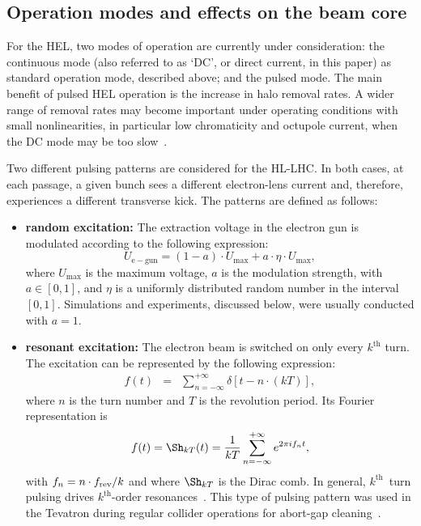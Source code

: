 \documentclass[%
 reprint,
 amsmath,amssymb,
 aps,
prstab,
longbibliography
]{revtex4-1}
\begin{document}
\subsection{Operation modes and effects on the beam core}
\label{sec:hel:core}

For the HEL, two modes of operation are currently under consideration:
the continuous mode (also referred to as `DC', or direct current, in
this paper) as standard operation mode, described above; and the
pulsed mode. The main benefit of pulsed HEL operation is the increase
in halo removal rates. A wider range of removal rates may become
important under operating conditions with small nonlinearities, in
particular low chromaticity and octupole current, when the DC mode may
be too slow~\cite{hel_halo_hllhc_fitterer, hl_halo_ipac2017}.

Two different pulsing patterns are considered for the HL-LHC. In both
cases, at each passage, a given bunch sees a different electron-lens
current and, therefore, experiences a different transverse kick. The
patterns are defined as follows:

\begin{itemize}

\item \textbf{random excitation:} The extraction voltage in the
  electron gun is modulated according to the
  following expression:
%
  \begin{equation}
    U_{\mathrm{e-gun}} = (1-a) \cdot U_{\mathrm{max}} +
    a \cdot \eta \cdot U_{\mathrm{max}},
  \end{equation}
%
  where $U_{\mathrm{max}}$ is the maximum voltage, $a$ is the
  modulation strength, with $a \in [0,1]$, and $\eta$ is a uniformly
  distributed random number in the interval~$[0,1]$. Simulations and
  experiments, discussed below, were usually conducted with $a = 1$.

\item \textbf{resonant excitation:} The electron beam is switched on
  only every $k^{\mathrm{th}}$ turn. The excitation can be represented
  by the following expression:
  \begin{eqnarray}
    \label{intro:eqn:1}
    f(t) & = & \sum_{n=-\infty}^{+\infty}\delta\left[t-n\cdot(kT)\right],
  \end{eqnarray}
  where $n$ is the turn number and $T$ is the revolution period. Its
  Fourier representation is
  \begin{equation}
    \label{intro:eqn:2}
    f(t) = \Sh_{kT}(t) = \frac{1}{kT}\sum_{n=-\infty}^{+\infty}e^{2\pi i f_nt},
  \end{equation}
  with $f_n = n \cdot f_{\rm rev} / k$ and
  where $\Sh_{kT}$ is the Dirac comb. In general,
  $k^{\mathrm{th}}$~turn pulsing drives $k^{\mathrm{th}}$-order
  resonances~\cite{md_sim_hel_res_ex_fitterer}. This type of pulsing
  pattern was used in the Tevatron during regular collider operations
  for abort-gap cleaning~\cite{hel_tevatron_abortgap_zhang}.
\end{itemize}
\end{document}
